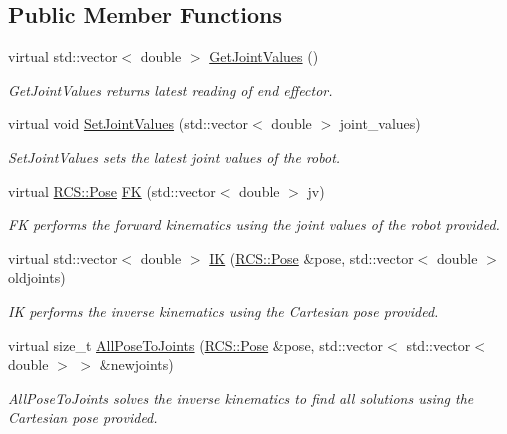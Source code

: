 \subsection*{Public Member Functions}
\begin{DoxyCompactItemize}
\item 
virtual std\-::vector$<$ double $>$ \hyperlink{classDummyKinematics_a630b1a37d23881be53147c07a87bffad}{Get\-Joint\-Values} ()
\begin{DoxyCompactList}\small\item\em Get\-Joint\-Values returns latest reading of end effector. \end{DoxyCompactList}\item 
virtual void \hyperlink{classDummyKinematics_a0b5a581fb840f304cebc80fb00eb7138}{Set\-Joint\-Values} (std\-::vector$<$ double $>$ joint\-\_\-values)
\begin{DoxyCompactList}\small\item\em Set\-Joint\-Values sets the latest joint values of the robot. \end{DoxyCompactList}\item 
virtual \hyperlink{namespaceRCS_aa07e45d8a50e30064283d2b38087f999}{R\-C\-S\-::\-Pose} \hyperlink{classDummyKinematics_a20570667281ca242ed0bf51b0f58222c}{F\-K} (std\-::vector$<$ double $>$ jv)
\begin{DoxyCompactList}\small\item\em F\-K performs the forward kinematics using the joint values of the robot provided. \end{DoxyCompactList}\item 
virtual std\-::vector$<$ double $>$ \hyperlink{classDummyKinematics_aed9dcd58e607ccfef58975040567a04a}{I\-K} (\hyperlink{namespaceRCS_aa07e45d8a50e30064283d2b38087f999}{R\-C\-S\-::\-Pose} \&pose, std\-::vector$<$ double $>$ oldjoints)
\begin{DoxyCompactList}\small\item\em I\-K performs the inverse kinematics using the Cartesian pose provided. \end{DoxyCompactList}\item 
virtual size\-\_\-t \hyperlink{classDummyKinematics_ac96c0c98a0ca7847ae38152c6de17d1c}{All\-Pose\-To\-Joints} (\hyperlink{namespaceRCS_aa07e45d8a50e30064283d2b38087f999}{R\-C\-S\-::\-Pose} \&pose, std\-::vector$<$ std\-::vector$<$ double $>$ $>$ \&newjoints)
\begin{DoxyCompactList}\small\item\em All\-Pose\-To\-Joints solves the inverse kinematics to find all solutions using the Cartesian pose provided. \end{DoxyCompactList}\item 

\end{DoxyCompactItemize}
